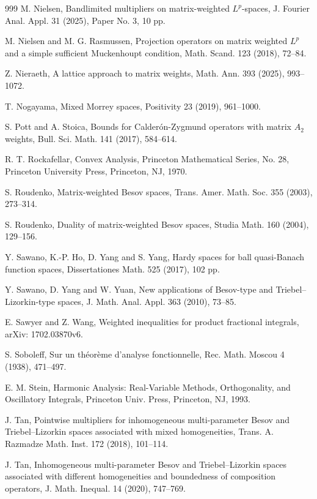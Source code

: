 \documentclass[11pt, reqno]{amsart}
\theoremstyle{definition}
\theoremstyle{remark}
\numberwithin{equation}{section}
\begin{document}
\begin{thebibliography}{999}
M. Nielsen,
Bandlimited multipliers on matrix-weighted $L^p$-spaces,
J. Fourier Anal. Appl. 31 (2025), Paper No. 3, 10 pp.

M. Nielsen and M. G. Rasmussen,
Projection operators on matrix weighted $L^p$ and a simple sufficient Muckenhoupt condition,
Math. Scand. 123 (2018), 72--84.

Z. Nieraeth,
A lattice approach to matrix weights,
Math. Ann. 393 (2025), 993--1072.

T. Nogayama,
Mixed Morrey spaces,
Positivity 23 (2019), 961--1000.

S. Pott and A. Stoica,
Bounds for Calder\'on-Zygmund operators with matrix $A_2$ weights,
Bull. Sci. Math. 141 (2017), 584--614.

R. T. Rockafellar,
Convex Analysis,
Princeton Mathematical Series, No. 28,
Princeton University Press, Princeton, NJ, 1970.

S. Roudenko,
Matrix-weighted Besov spaces,
Trans. Amer. Math. Soc. 355 (2003), 273--314.

S. Roudenko,
Duality of matrix-weighted Besov spaces,
Studia Math. 160 (2004), 129--156.

Y. Sawano, K.-P. Ho, D. Yang and S. Yang,
Hardy spaces for ball quasi-Banach function spaces,
Dissertationes Math. 525 (2017), 102 pp.

Y. Sawano, D. Yang and W. Yuan,
New applications of Besov-type and Triebel--Lizorkin-type spaces,
J. Math. Anal. Appl. 363 (2010), 73--85.

E. Sawyer and Z. Wang,
Weighted inequalities for product fractional integrals,
arXiv: 1702.03870v6.

S. Soboleff,
Sur un th\'eorème d'analyse fonctionnelle,
Rec. Math. Moscou 4 (1938), 471--497.

E. M. Stein,
Harmonic Analysis: Real-Variable Methods, Orthogonality, and Oscillatory Integrals,
Princeton Univ. Press, Princeton, NJ, 1993.

J. Tan,
Pointwise multipliers for inhomogeneous multi-parameter Besov and
Triebel--Lizorkin spaces associated with mixed homogeneities,
Trans. A. Razmadze Math. Inst. 172 (2018), 101--114.

J. Tan,
Inhomogeneous multi-parameter Besov and Triebel--Lizorkin spaces
associated with different homogeneities and boundedness of composition operators,
J. Math. Inequal. 14 (2020), 747--769.


\end{thebibliography}
\end{document}
